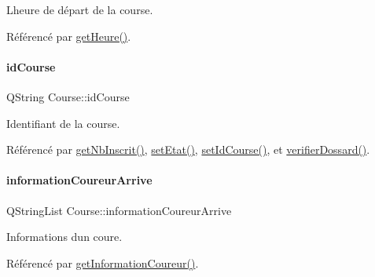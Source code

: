 L\textquotesingle{}heure de départ de la course. 



Référencé par \hyperlink{class_course_afc21f8195edd50c9fd266cff0c401b7c}{get\+Heure()}.

\mbox{\label{class_course_a1f80798e50be6db9911a882a2491c698}} 
\paragraph{\texorpdfstring{id\+Course}{idCourse}}
{\footnotesize\ttfamily Q\+String Course\+::id\+Course\hspace{0.3cm}{\ttfamily [private]}}



Identifiant de la course. 



Référencé par \hyperlink{class_course_ad0ff4153f1e02826d551f478f95ad260}{get\+Nb\+Inscrit()}, \hyperlink{class_course_a3ebcde1fa443cb20d71fb98af4d0c418}{set\+Etat()}, \hyperlink{class_course_a36cf16c971841431947b6fbe2b3f3d27}{set\+Id\+Course()}, et \hyperlink{class_course_a6cb3ede6a11e4813f95be92f4459a3c2}{verifier\+Dossard()}.

\mbox{\label{class_course_a14838cc0c491a76baf7e5f12d8d08ab4}} 
\paragraph{\texorpdfstring{information\+Coureur\+Arrive}{informationCoureurArrive}}
{\footnotesize\ttfamily Q\+String\+List Course\+::information\+Coureur\+Arrive\hspace{0.3cm}{\ttfamily [private]}}



Informations d\textquotesingle{}un coure. 



Référencé par \hyperlink{class_course_a7ba5d2c9865065e95f49a24fbeec7857}{get\+Information\+Coureur()}.

\mbox{\label{class_course_a0c9b246b0f1ec612bd6e6c613a94d52b}} 
